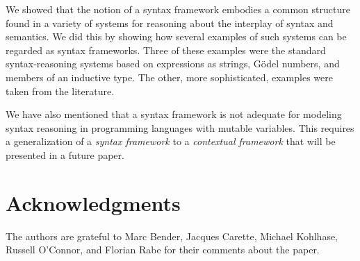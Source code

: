 \documentclass[11pt,fleqn]{article}
\newcommand{\bsp}{\begin{sloppypar}}
\newcommand{\esp}{\end{sloppypar}}
\begin{document}
We showed that the notion of a syntax framework embodies a common
structure found in a variety of systems for reasoning about the
interplay of syntax and semantics.  We did this by showing how several
examples of such systems can be regarded as syntax frameworks.  Three
of these examples were the standard syntax-reasoning systems based on
expressions as strings, G\"odel numbers, and members of an inductive
type.  The other, more sophisticated, examples were taken from
the literature.

We have also mentioned that a syntax framework is not adequate for
modeling syntax reasoning in programming languages with mutable
variables.  This requires a generalization of a \emph{syntax
  framework} to a \emph{contextual framework} that will be presented
in a future paper.

\section*{Acknowledgments}
\bsp
The authors are grateful to Marc Bender, Jacques Carette, Michael
Kohlhase, Russell O'Connor, and Florian Rabe for their comments about
the paper.
\esp  

\iffalse

The authors would also like to thank the referees for their detailed
examination of the paper and valuable suggestions.

\fi

 

\end{document}
